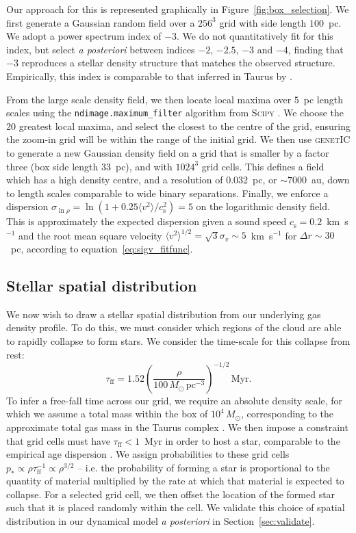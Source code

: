 \documentclass{aa}
\begin{document}
Our approach for this is represented graphically in Figure~\ref{fig:box_selection}. We first generate a Gaussian random field over a $256^3$ grid with side length $100$~pc. We adopt a power spectrum index of $-3$. We do not quantitatively fit for this index, but select \textit{a posteriori}  between indices $-2$, $-2.5$, $-3$ and $-4$, finding that $-3$ reproduces a stellar density structure that matches the observed structure. Empirically, this index is comparable to that inferred in Taurus by \citet{Brunt10}. 

From the large scale density field, we then locate local maxima over $5$~pc length scales using the \texttt{ndimage.maximum\_filter} algorithm from \textsc{Scipy} \citep{Virtanen20scipy}. We choose the 20 greatest local maxima, and select the closest to the centre of the grid, ensuring the zoom-in grid will be within the range of the initial grid. We then use \textsc{genetIC} to generate a new Gaussian density field on a grid that is smaller by a factor three (box side length $33$~pc), and with $1024^3$ grid cells. This defines a field which has a high density centre, and a resolution of $0.032$~pc, or $\sim 7000$~au, down to length scales comparable to wide binary separations. Finally, we enforce a dispersion $\sigma_{\ln \rho} = \ln \left(1 + 0.25  \langle v^2 \rangle /c_\mathrm{s}^2\right) = 5$ on the logarithmic density field. This is approximately the expected dispersion given a sound speed $c_\mathrm{s}= 0.2$~km~s$^{-1}$ and the root mean square velocity $\langle v^2 \rangle^{1/2}=  \sqrt{3} \sigma_v \sim 5$~km~s$^{-1}$ for $\Delta r \sim 30$~pc, according to equation~\ref{eq:sigv_fitfunc}. 

\subsection{Stellar spatial distribution}
\label{sec:single_stars}
We now wish to draw a stellar spatial distribution from our underlying gas density profile. To do this, we must consider which regions of the cloud are able to rapidly collapse to form stars. We consider the time-scale for this collapse from rest:
\begin{equation}
    \tau_\mathrm{ff} = 1.52 \left( \frac{\rho}{100 \, M_\odot \,\mathrm{pc}^{-3}}\right)^{-1/2} \, \mathrm{Myr}.
\end{equation}To infer a free-fall time across our grid, we require an absolute density scale, for which we assume a total mass within the box of $10^4 \, M_\odot$, corresponding to the approximate total gas mass in the Taurus complex \citep{Goldsmith08}. We then impose a constraint that grid cells must have $\tau_\mathrm{ff} < 1$~Myr in order to host a star, comparable to the empirical age dispersion \cite{Luhman23}. We assign probabilities to these grid cells $p_* \propto \rho \tau_\mathrm{ff}^{-1} \propto \rho^{3/2}$ -- i.e. the probability of forming a star is proportional to the quantity of material multiplied by the rate at which that material is expected to collapse. For a selected grid cell, we then offset the location of the formed star such that it is placed randomly within the cell. We validate this choice of spatial distribution in our dynamical model \textit{a posteriori} in Section~\ref{sec:validate}. 
\end{document}
